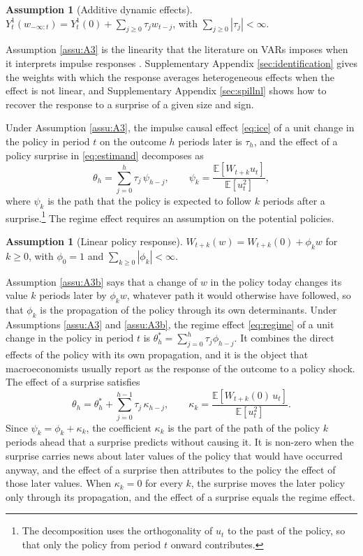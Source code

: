 \documentclass[12pt,a4paper]{article}
\theoremstyle{definition}
\newtheorem{assumption}{Assumption}
\newtheorem{assumptionb}{Assumption}\renewcommand{\theassumptionb}{3$'$}
\theoremstyle{definition}\newtheorem{example}{Example}
\theoremstyle{definition}\newtheorem{definition}{Definition}
\newcommand{\E}{\mathbb{E}}
\begin{document}
\begin{assumption}[Additive dynamic effects\label{assu:A3}]
$Y^1_t(w_{-\infty:t})=Y^1_t(0)+\sum_{j\geq0}\tau_jw_{t-j}$, with $\sum_{j\geq0}|\tau_j|<\infty$.
\end{assumption}

Assumption \ref{assu:A3} is the linearity that the literature on VARs imposes when it interprets impulse responses \citep{KilianLutkepohl2017}. Supplementary Appendix \ref{sec:identification} gives the weights with which the response averages heterogeneous effects when the effect is not linear, and Supplementary Appendix \ref{sec:spillnl} shows how to recover the response to a surprise of a given size and sign.

Under Assumption \ref{assu:A3}, the impulse causal effect \eqref{eq:ice} of a unit change in the policy in period $t$ on the outcome $h$ periods later is $\tau_h$, and the effect of a policy surprise in \eqref{eq:estimand} decomposes as
\begin{equation}
\theta_h=\sum_{j=0}^h\tau_j\,\psi_{h-j},\qquad \psi_k=\frac{\E[W_{t+k}u_t]}{\E[u_t^2]},
\label{eq:decomp}
\end{equation}
where $\psi_k$ is the path that the policy is expected to follow $k$ periods after a surprise.\footnote{The decomposition uses the orthogonality of $u_t$ to the past of the policy, so that only the policy from period $t$ onward contributes.} The regime effect requires an assumption on the potential policies.

\begin{assumptionb}[Linear policy response\label{assu:A3b}]
$W_{t+k}(w)=W_{t+k}(0)+\phi_kw$ for $k\geq0$, with $\phi_0=1$ and $\sum_{k\geq0}|\phi_k|<\infty$.
\end{assumptionb}

Assumption \ref{assu:A3b} says that a change of $w$ in the policy today changes its value $k$ periods later by $\phi_kw$, whatever path it would otherwise have followed, so that $\phi_k$ is the propagation of the policy through its own determinants. Under Assumptions \ref{assu:A3} and \ref{assu:A3b}, the regime effect \eqref{eq:regime} of a unit change in the policy in period $t$ is $\theta^\ast_h=\sum_{j=0}^h\tau_j\phi_{h-j}$. It combines the direct effects of the policy with its own propagation, and it is the object that macroeconomists usually report as the response of the outcome to a policy shock. The effect of a surprise satisfies
\begin{equation}
\theta_h=\theta^\ast_h+\sum_{j=0}^{h-1}\tau_j\,\kappa_{h-j},\qquad \kappa_k=\frac{\E[W_{t+k}(0)\,u_t]}{\E[u_t^2]}.
\label{eq:pathbias}
\end{equation}
Since $\psi_k=\phi_k+\kappa_k$, the coefficient $\kappa_k$ is the part of the path of the policy $k$ periods ahead that a surprise predicts without causing it. It is non-zero when the surprise carries news about later values of the policy that would have occurred anyway, and the effect of a surprise then attributes to the policy the effect of those later values. When $\kappa_k=0$ for every $k$, the surprise moves the later policy only through its propagation, and the effect of a surprise equals the regime effect.
\end{document}

